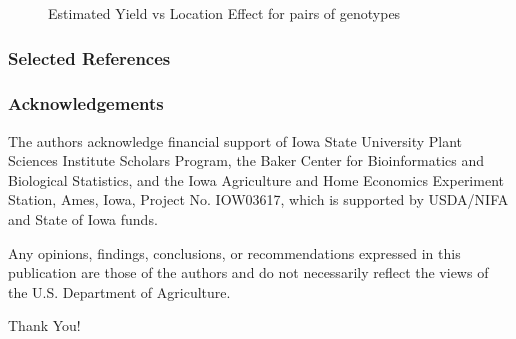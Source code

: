 \documentclass{beamer}
\begin{document}
\begin{frame}
\begin{figure}[H]
  \caption{Estimated Yield vs Location Effect for pairs of genotypes}
\end{figure}


\end{frame}




\begin{frame}
\frametitle{Selected References}


\end{frame}



\begin{frame}
\frametitle{Acknowledgements}
The authors acknowledge financial support of Iowa State University Plant Sciences Institute Scholars Program, the Baker Center for Bioinformatics and Biological Statistics, and the Iowa Agriculture and Home Economics Experiment Station, Ames, Iowa, Project No. IOW03617, which is supported by USDA/NIFA and State of Iowa funds. 


Any opinions, findings, conclusions, or recommendations expressed in this publication are those of the authors and do not necessarily reflect the views of the U.S. Department of Agriculture.
\end{frame}




\begin{frame}%
\begin{center}
\Huge Thank You!
\end{center}
\end{frame}
\end{document}
